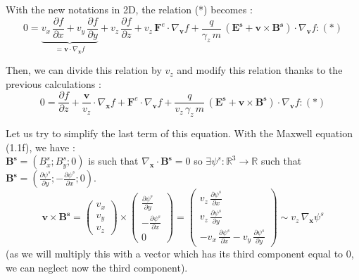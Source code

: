 \documentclass[10pt]{article}
\newcommand{\D}{{\partial}}
\begin{document}
With the new notations in 2D, the relation (*) becomes :
$$ 0 = \underbrace{v_x\,\frac{\D f}{\D x} + v_y\,\frac{\D f}{\D y}}_{=\mathbf{v} \cdot  \nabla_{\mathbf{x}}f} + v_z\,\frac{\D f}{\D z} + v_z\,\mathbf{F}^{e} \cdot \nabla_{\mathbf{v}}f + \frac{q}{\gamma_{z}\,m}\,(\mathbf{E^s}+\mathbf{v}\times\mathbf{B^s}) \cdot \nabla_{\mathbf{v}}f : (*)$$

Then, we can divide this relation by $v_z$ and modify this relation thanks to the previous calculations :
$$ 0 = \frac{\D f}{\D z} + \frac{\mathbf{v}}{v_z} \cdot \nabla_{\mathbf{x}}f + \mathbf{F}^{e} \cdot \nabla_{\mathbf{v}}f + \frac{q}{v_z\,\gamma_{z}\,m}\,(\mathbf{E^s}+\mathbf{v}\times\mathbf{B^s}) \cdot \nabla_{\mathbf{v}}f : (*)$$

Let us try to simplify the last term of this equation. With the Maxwell equation (1.1f), we have :\\

$\mathbf{B^s} = (B_x^s;B_y^s;0)$ is such that $\nabla_{\mathbf{x}} \cdot \mathbf{B^s} = 0$ so $\exists \psi^{s}:\mathbb{R}^3\rightarrow\mathbb{R}$ such that $\mathbf{B^s} = \left(\frac{\D \psi^{s}}{\D y}; - \frac{\D \psi^{s}}{\D x};0\right)$. \\

$$\mathbf{v} \times \mathbf{B^s} = \left( \begin{array}{c}
v_x \\
v_y \\
v_z
\end{array} \right) \times \left(
\begin{array}{c}
\frac{\D \psi^{s}}{\D y} \\
- \frac{\D \psi^{s}}{\D x}\\
0
\end{array} \right) = \left( \begin{array}{c}
v_z\,\frac{\D \psi^{s}}{\D x} \\
v_z\,\frac{\D \psi^{s}}{\D y} \\
- v_x\,\frac{\D \psi^{s}}{\D x} - v_y\,\frac{\D \psi^{s}}{\D y}
\end{array} \right) \sim v_z\,\nabla_{\mathbf{x}}\psi^s$$ (as we will multiply this with a vector which has its third component equal to 0, we can neglect now the third component). \\
\end{document}
